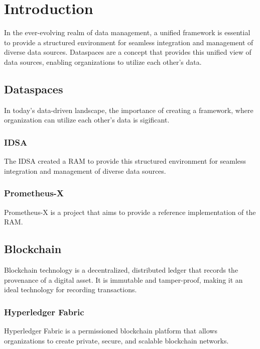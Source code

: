 \chapter{Introduction}

In the ever-evolving realm of data management, a unified framework is essential to provide a structured environment for seamless integration and management of diverse data sources. Dataspaces are a concept that provides this unified view of data sources, enabling organizations to utilize each other's data.

\section{Dataspaces}

In today's data-driven landscape, the importance of creating a framework, where organization can utilize each other's data is sigificant.

\subsection{IDSA}

The \ac{IDSA} created a \ac{RAM}\cite{ids-ram} to provide this structured environment for seamless integration and management of diverse data sources.

\subsection{Prometheus-X}

Prometheus-X is a project that aims to provide a reference implementation of the \ac{RAM}.

\section{Blockchain}

Blockchain technology is a decentralized, distributed ledger that records the provenance of a digital asset. It is immutable and tamper-proof, making it an ideal technology for recording transactions.

\subsection{Hyperledger Fabric}

Hyperledger Fabric is a permissioned blockchain platform that allows organizations to create private, secure, and scalable blockchain networks.